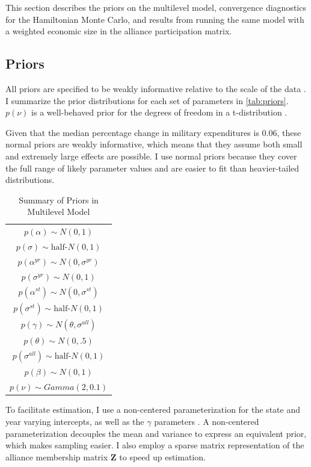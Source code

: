 \documentclass[12pt]{article}
\begin{document}
This section describes the priors on the multilevel model, convergence diagnostics for the Hamiltonian Monte Carlo, and results from running the same model with a weighted economic size in the alliance participation matrix. 


\subsection{Priors} 

All priors are specified to be weakly informative relative to the scale of the data \citep{Gelmanetal2017}. 
I summarize the prior distributions for each set of parameters in \autoref{tab:priors}. 
$p(\nu)$ is a well-behaved prior for the degrees of freedom in a t-distribution \citep{JuarezSteele2010}. 


Given that the median percentage change in military expenditures is 0.06, these normal priors are weakly informative, which means that they assume both small and extremely large effects are possible.
I use normal priors because they cover the full range of likely parameter values and are easier to fit than heavier-tailed distributions.  


\begin{table} %
\begin{center}
\begin{tabular}{c} 
$ p(\alpha) \sim N(0, 1)$  \\
$ p(\sigma) \sim \mbox{half-}N(0, 1) $ \\
$ p(\alpha^{yr}) \sim N(0, \sigma^{yr}) $ \\ 
$ p(\sigma^{yr}) \sim N(0, 1) $ \\
$ p(\alpha^{st}) \sim N(0, \sigma^{st}) $ \\ 
$ p(\sigma^{st}) \sim \mbox{half-}N(0, 1) $ \\ 
$ p(\gamma) \sim N(\theta, \sigma^{all}) $ \\ 
$ p(\theta) \sim N(0, .5) $ \\
$ p(\sigma^{all}) \sim \mbox{half-}N(0, 1) $ \\
$ p(\beta) \sim N(0, 1) $ \\
$ p(\nu) \sim Gamma(2, 0.1)$ 
\end{tabular} 
\caption{Summary of Priors in Multilevel Model} 
\label{tab:priors}
\end{center} 
\end{table} 


To facilitate estimation, I use a non-centered parameterization for the state and year varying intercepts, as well as the $\gamma$ parameters \citep{BetancourtGirolani2015}. 
A non-centered parameterization decouples the mean and variance to express an equivalent prior, which makes sampling easier. 
I also employ a sparse matrix representation of the alliance membership matrix $\textbf{Z}$ to speed up estimation. 
\end{document}
